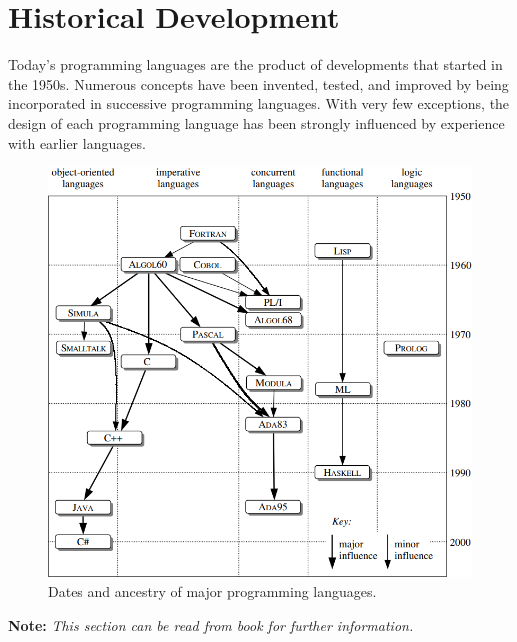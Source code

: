 \documentclass{article}
\begin{document}
\section{Historical Development}

Today’s programming languages are the product of developments that started in the 1950s. Numerous concepts have been invented, tested, and improved by being incorporated in successive programming languages. With very few exceptions, the design of each programming language has been strongly influenced by experience with earlier languages.

\begin{figure}[h!]
    \centering
    \includegraphics[width=\textwidth]{img/1.1-Programming-Languages.png}
    \caption{Dates and ancestry of major programming languages.}
    \label{fig:my_label}
\end{figure}

\textbf{Note:} \textit{This section can be read from book for further information.}
\end{document}
